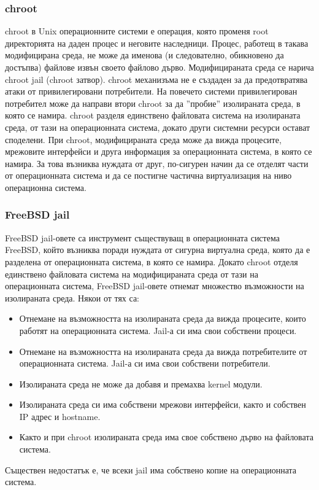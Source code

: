 \documentclass[pdftex,14pt,a4paper]{extreport}
\begin{document}
\subsubsection {chroot}
chroot в Unix операционните системи е операция, която променя root директорията на даден процес и неговите наследници. Процес, работещ в такава модифицирана среда, не може да именова (и следователно, обикновено да достъпва) файлове извън своето файлово дърво. Модифицираната среда се нарича chroot jail (chroot затвор). chroot механизъма не е създаден за да предотвратява атаки от привилегировани потребители. На повечето системи привилегирован потребител може да направи втори chroot за да ''пробие'' изолираната среда, в която се намира. chroot разделя единствено файловата система на изолираната среда, от тази на операционната система, докато други системни ресурси остават споделени. При chroot, модифицираната среда може да вижда процесите, мрежовите интерфейси и друга информация за операционната система, в която се намира. За това възниква нуждата от друг, по-сигурен начин да се отделят части от операционната система и да се постигне частична виртуализация на ниво операционна система.
\subsubsection {FreeBSD jail}
FreeBSD jail-овете са инструмент съществуващ в операционната система FreeBSD, който възниква поради нуждата от сигурна виртуална среда, която да е разделена от операционната система, в която се намира. Докато chroot отделя единствено файловата система на модифицираната среда от тази на операционната система, FreeBSD jail-овете отнемат множество възможности на изолираната среда. Някои от тях са:
\begin{itemize}
  \item Отнемане на възможността на изолираната среда да вижда процесите, които работят на операционната система. Jail-а си има свои собствени процеси.
  \item Отнемане на възможността на изолираната среда да вижда потребителите от операционната система. Jail-а си има свои собствени потребители.
  \item Изолираната среда не може да добавя и премахва kernel модули.
  \item Изолираната среда си има собствени мрежови интерфейси, както и собствен IP адрес и hostname.
  \item Както и при chroot изолираната среда има свое собствено дърво на файловата система.
\end{itemize}
Съществен недостатък е, че всеки jail има собствено копие на операционната система.
\end{document}
